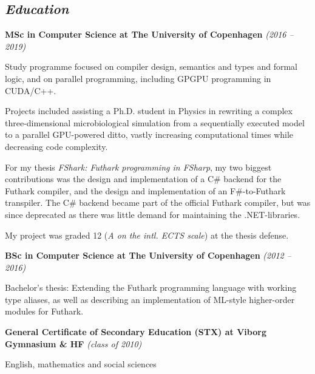 \documentclass[10pt, a4paper]{article}
\begin{document}
\subsection*{\textit{Education}}
\textbf{MSc in Computer Science at The University of Copenhagen} \textit{(2016 -- 2019)}
\begin{outline}
  \1 Study programme focused on compiler design, semantics and types and formal logic, and on parallel programming, including GPGPU programming in CUDA/C++.

  \1 Projects included assisting a Ph.D. student in Physics in rewriting a complex three-dimensional microbiological simulation from a sequentially executed model to a parallel GPU-powered ditto, vastly increasing computational times while decreasing code complexity.
  
  \1 For my thesis \textit{FShark: Futhark programming in FSharp}, my two biggest contributions was the design and implementation of a C\# backend for the Futhark compiler, and the design and implementation of an F\#-to-Futhark transpiler. The C\# backend became part of the official Futhark compiler, but was since deprecated as there was little demand for maintaining the .NET-libraries.

  \1 My project was graded 12 (\textit{A on the intl. ECTS scale}) at the thesis defense.
\end{outline}
  
\textbf{BSc in Computer Science at The University of Copenhagen} \textit{(2012 -- 2016)}
\begin{outline}
\1 Bachelor's thesis: Extending the Futhark programming language with working type aliases, as well as describing an implementation of ML-style higher-order modules for Futhark.
\end{outline}

\textbf{General Certificate of Secondary Education (STX) at Viborg Gymnasium \& HF} \textit{(class of 2010)}
\begin{outline}
\1 English, mathematics and social sciences
\end{outline}
\end{document}
